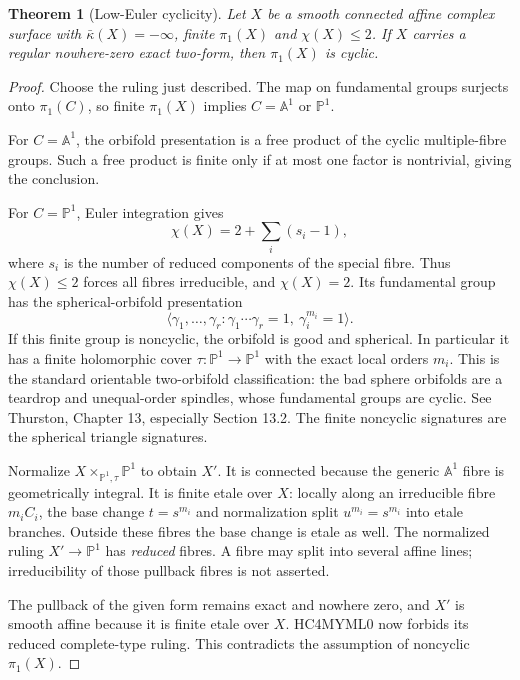 \documentclass[11pt]{article}
\newtheorem{theorem}{Theorem}
\newcommand{\A}{\mathbb A}
\begin{document}
\begin{theorem}[Low-Euler cyclicity]\label{thm:cyclic}
Let $X$ be a smooth connected affine complex surface with
$\bar\kappa(X)=-\infty$, finite $\pi_1(X)$ and $\chi(X)\le2$.
If $X$ carries a regular nowhere-zero exact two-form, then
$\pi_1(X)$ is cyclic.
\end{theorem}
\begin{proof}
Choose the ruling just described. The map on fundamental groups
surjects onto $\pi_1(C)$, so finite $\pi_1(X)$ implies
$C=\A^1$ or $\mathbb P^1$.

For $C=\A^1$, the orbifold presentation is a free product of the cyclic
multiple-fibre groups. Such a free product is finite only if at most
one factor is nontrivial, giving the conclusion.

For $C=\mathbb P^1$, Euler integration gives
\[
       \chi(X)=2+\sum_i(s_i-1),
\]
where $s_i$ is the number of reduced components of the special fibre.
Thus $\chi(X)\le2$ forces all fibres irreducible, and $\chi(X)=2$.
Its fundamental group has the spherical-orbifold presentation
\[
 \langle\gamma_1,\ldots,\gamma_r:
       \gamma_1\cdots\gamma_r=1,\ \gamma_i^{m_i}=1\rangle.     \tag{1}
\]
If this finite group is noncyclic, the orbifold is good and spherical.
In particular it has a finite holomorphic cover
$\tau:\mathbb P^1\to\mathbb P^1$ with the exact local orders $m_i$.
This is the standard orientable two-orbifold classification: the bad
sphere orbifolds are a teardrop and unequal-order spindles, whose
fundamental groups are cyclic. See Thurston, Chapter 13, especially
Section 13.2. The finite noncyclic signatures are the spherical triangle
signatures.

Normalize $X\times_{\mathbb P^1,\tau}\mathbb P^1$ to obtain $X'$.
It is connected because the generic $\A^1$ fibre is geometrically
integral. It is finite etale over $X$: locally along an irreducible
fibre $m_iC_i$, the base change $t=s^{m_i}$ and normalization split
$u^{m_i}=s^{m_i}$ into etale branches. Outside these fibres the base
change is etale as well. The normalized ruling $X'\to\mathbb P^1$ has
\emph{reduced} fibres. A fibre may split into several affine lines;
irreducibility of those pullback fibres is not asserted.

The pullback of the given form remains exact and nowhere zero, and
$X'$ is smooth affine because it is finite etale over $X$.
HC4MYML0 now forbids its reduced complete-type ruling. This contradicts
the assumption of noncyclic $\pi_1(X)$.
\end{proof}
\end{document}
